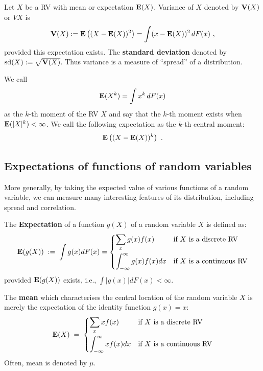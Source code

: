 \begin{definition}[Variance of a RV]\label{D:VarianceofX}
Let $X$ be a RV with mean or expectation $\mathbf{E}(X)$.  Variance of $X$ denoted by $\mathbf{V}(X)$ or $VX$ is
\[
\mathbf{V}(X) := \mathbf{E} \left((X-\mathbf{E}(X))^2\right) = \int (x-\mathbf{E}(X))^2 \,d F(x) \ ,
\]
provided this expectation exists.  The {\bf standard deviation} denoted by ${\rm sd}(X) := \sqrt{\mathbf{V}(X)}$.
Thus variance is a measure of ``spread'' of a distribution.
\end{definition}

\begin{definition}[$k$-th moment of a RV]
We call 
\[
\mathbf{E}(X^k) = \int x^k\,dF(x)
\]
as the $k$-th moment of the RV $X$ and say that the $k$-th moment exists when $\mathbf{E}(|X|^k) < \infty$.  We call the following expectation as the $k$-th central moment:
\[
\mathbf{E} \left((X- \mathbf{E}(X))^k\right) \ .
\]
\end{definition}


\subsection{Expectations of functions of random variables}\label{S:ExpectationsOfFunsOfRVs}

More generally, by taking the expected value of various functions of a random variable, we can measure many interesting features of its distribution, including spread and correlation.

\begin{definition}\label{Df:expectation}
The \textbf{Expectation} of a function $g(X)$ of a random variable $X$ is defined as:
\[
\mathbf{E}(g(X))\; :=\; \int g(x) dF(x) = 
\begin{cases}
\displaystyle \sum_x g(x) f(x) & \text{if $X$ is a discrete RV}\\[12pt]
\displaystyle \int_{-\infty}^{\infty} g(x) f(x) dx & \text{if $X$ is a continuous RV}
\end{cases}
\]
provided $\mathbf{E}(g(X))$ exists, i.e., $\int |g(x)| dF(x) < \infty$.
\end{definition}

The {\bf mean} which characterises the central location of the random variable $X$ is merely the expectation of the identity function $g(x)=x$:
\[
\mathbf{E}(X)\; =\;
\begin{cases}
\displaystyle \sum_x x f(x) & \text{if $X$ is a discrete RV}\\[12pt]
\displaystyle\int_{-\infty}^{\infty} x f(x) dx & \text{if $X$ is a
  continuous RV}
\end{cases}
\]
Often, mean is denoted by $\mu$.


